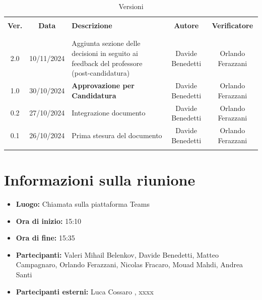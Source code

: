 \documentclass[italian, 12pt]{article}
\begin{document}
\pagestyle{mystyle}


\begin{table}[!h]
	\caption{Versioni}
	\begin{center}
		\begin{tabular}{ c c p{6.2cm} c c}
			\hline \\[-2ex]
			\textbf{Ver.} & \textbf{Data} & \textbf{Descrizione} & \textbf{Autore} & \textbf{Verificatore}  \\
			\\[-2ex] \hline \\[-1.5ex]
            2.0 & 10/11/2024 & Aggiunta sezione delle decisioni in seguito ai feedback del professore (post-candidatura) & Davide Benedetti & Orlando Ferazzani\\
            1.0 & 30/10/2024 & \textbf{Approvazione per Candidatura} & Davide Benedetti & Orlando Ferazzani\\
            0.2 & 27/10/2024 & Integrazione documento & Davide Benedetti & Orlando Ferazzani\\
			0.1 & 26/10/2024 & Prima stesura del documento & Davide Benedetti & Orlando Ferazzani\\
			\\[-1.5ex] \hline
		\end{tabular}
	\end{center}
\end{table}


\tableofcontents
\newpage


\section{Informazioni sulla riunione}
\begin{itemize}
    \item \textbf{Luogo:} Chiamata sulla piattaforma Teams
    \item \textbf{Ora di inizio:} 15:10
    \item \textbf{Ora di fine:} 15:35
    \item \textbf{Partecipanti:} Valeri Mihail Belenkov, Davide Benedetti, Matteo Campagnaro, Orlando Ferazzani, Nicolas Fracaro, Mouad Mahdi, Andrea Santi 
    \item \textbf{Partecipanti esterni:} Luca Cossaro , xxxx
\end{itemize}
\end{document}
